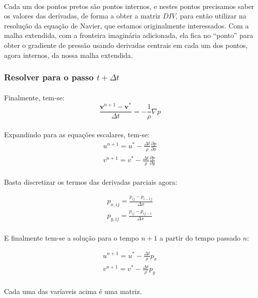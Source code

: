 \documentclass[a4paper,11pt]{article}
\begin{document}
\paragraph{} Cada um dos pontos pretos são pontos internos, e nestes pontos precisamos saber os valores das derivadas, de forma a obter a matriz $DIV$, para então utilizar na resolução da equação de Navier, que estamos originalmente interessados. Com a malha extendida, com a fronteira imaginária adicionada, ela fica no ``ponto'' para obter o gradiente de pressão usando derivadas centrais em cada um dos pontos, agora internos, da nossa malha extendida.

\subsubsection{Resolver para o passo $t+\Delta t$}
\paragraph{} Finalmente, tem-se:
\begin{equation}
\frac{\textbf{v}^{n+1}-\textbf{v}^*}{\Delta t}=-\frac{1}{\rho}\nabla p
\end{equation}
\paragraph{} Expandindo para as equações escalares, tem-se:
\begin{eqnarray}
u^{n+1}=u^*-\frac{\Delta t}{\rho}\frac{\partial p}{\partial x}\\
v^{n+1}=v^*-\frac{\Delta t}{\rho}\frac{\partial p}{\partial y}
\end{eqnarray}
\paragraph{} Basta discretizar os termos das derivadas parciais agora:

\begin{eqnarray}
p_{x,ij}=\frac{p_{ij}-p_{i-1j}}{\Delta x}\\
p_{y,ij}=\frac{p_{ij}-p_{ij-1}}{\Delta x}
\end{eqnarray}

\paragraph{} E finalmente tem-se a solução para o tempo $n+1$ a partir do tempo passado $n$:

\begin{eqnarray}
u^{n+1}=u^*-\frac{\Delta t}{\rho}p_x\\
v^{n+1}=v^*-\frac{\Delta t}{\rho}p_y
\end{eqnarray}
\paragraph{} Cada uma das varíaveis acima é uma matriz.
\end{document}
